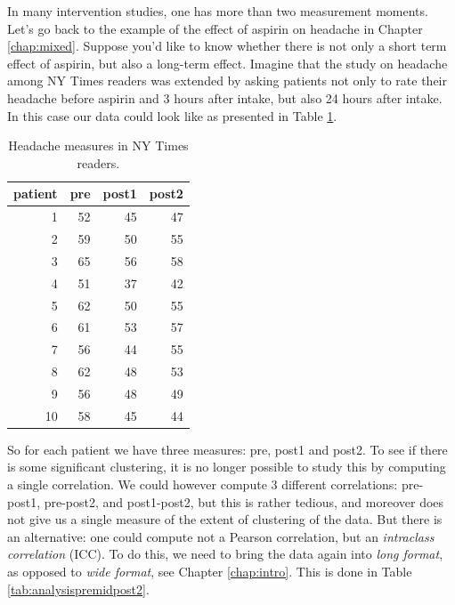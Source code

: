 \documentclass[]{book}\usepackage[]{graphicx}\usepackage[]{color}
\begin{document}
In many intervention studies, one has more than two measurement moments. Let's go back to the example of the effect of aspirin on headache in Chapter \ref{chap:mixed}. Suppose you'd like to know whether there is not only a short term effect of aspirin, but also a long-term effect. Imagine that the study on headache among NY Times readers was extended by asking patients not only to rate their headache before aspirin and 3 hours after intake, but also 24 hours after intake. In this case our data could look like as presented in Table \ref{tab:analysispremidpost1}.

\begin{table}[ht]
\centering
\caption{Headache measures in NY Times readers.} 
\label{tab:analysispremidpost1}
\begin{tabular}{rrrr}
  \hline
patient & pre & post1 & post2 \\ 
  \hline
1 & 52 & 45 & 47 \\ 
  2 & 59 & 50 & 55 \\ 
  3 & 65 & 56 & 58 \\ 
  4 & 51 & 37 & 42 \\ 
  5 & 62 & 50 & 55 \\ 
  6 & 61 & 53 & 57 \\ 
  7 & 56 & 44 & 55 \\ 
  8 & 62 & 48 & 53 \\ 
  9 & 56 & 48 & 49 \\ 
  10 & 58 & 45 & 44 \\ 
   \hline
\end{tabular}
\end{table}


So for each patient we have three measures: pre, post1 and post2. To see if there is some significant clustering, it is no longer possible to study this by computing a single correlation. We could however compute 3 different correlations: pre-post1, pre-post2, and post1-post2, but this is rather tedious, and moreover does not give us a single measure of the extent of clustering of the data. But there is an alternative: one could compute not a Pearson correlation, but an \textit{intraclass correlation} (ICC). To do this, we need to bring the data again into \textit{long format}, as opposed to \textit{wide format}, see Chapter \ref{chap:intro}. This is done in Table \ref{tab:analysispremidpost2}.
\end{document}
